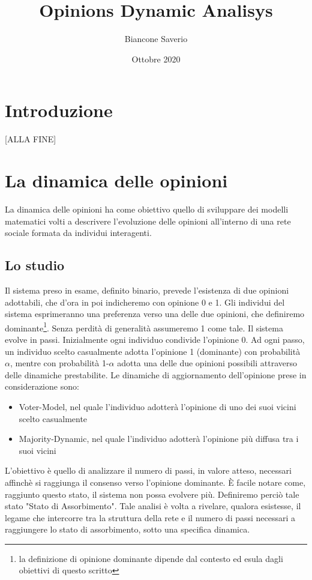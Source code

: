 \documentclass{article}
\title{Opinions Dynamic Analisys}
\author{Biancone Saverio}
\date{Ottobre 2020}
\begin{document}
\maketitle

\section{Introduzione}
[ALLA FINE]
\section{La dinamica delle opinioni}
La dinamica delle opinioni ha come obiettivo quello di sviluppare dei modelli matematici volti a descrivere l'evoluzione delle opinioni all'interno di una rete sociale formata da individui interagenti.
\newline
\newline
\subsection{Lo studio}
Il sistema preso in esame, definito binario, prevede l'esistenza di due opinioni adottabili, che d'ora in poi indicheremo con opinione 0 e 1. Gli individui del sistema esprimeranno una preferenza verso una delle due opinioni, che definiremo  dominante\footnote{la definizione di opinione dominante dipende dal contesto ed esula dagli obiettivi di questo scritto}.
\newline
Senza perdità di generalità assumeremo 1 come tale.
\newline
\newline
Il sistema evolve in passi. Inizialmente ogni individuo condivide l'opinione 0.
\newline
Ad ogni passo, un individuo scelto casualmente adotta l'opinione 1 (dominante) con probabilità $\alpha$, mentre con probabilità 1-$\alpha$ adotta una delle due opinioni possibili attraverso delle dinamiche prestabilite.
\newline
\newline
Le dinamiche di aggiornamento dell'opinione prese in considerazione sono:
\begin{itemize}
\item Voter-Model, nel quale l'individuo adotterà l'opinione di uno dei suoi vicini scelto casualmente
\item Majority-Dynamic, nel quale l'individuo adotterà l'opinione più diffusa tra i suoi vicini
\end{itemize}
\newline
L'obiettivo è quello di analizzare il numero di passi, in valore atteso, necessari affinchè si raggiunga il consenso verso l'opinione dominante. È facile notare come, raggiunto questo stato, il sistema non possa evolvere più. Definiremo perciò tale stato "Stato di Assorbimento". 
\newline
\newline
Tale analisi è volta a rivelare, qualora esistesse, il legame che intercorre tra la struttura della rete e il numero di passi necessari a raggiungere lo stato di assorbimento, sotto una specifica dinamica.
\end{document}
